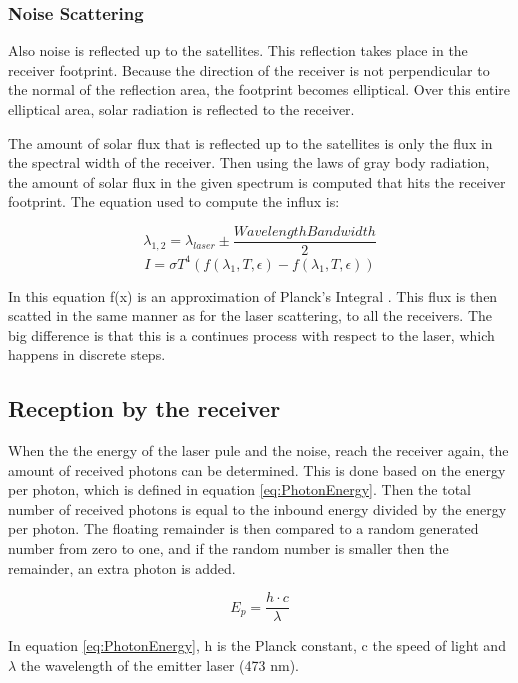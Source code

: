 \subsubsection{Noise Scattering}

Also noise is reflected up to the satellites. This reflection takes place in the receiver footprint. Because the direction of the receiver is not perpendicular to the normal of the reflection area, the footprint becomes elliptical. Over this entire elliptical area, solar radiation is reflected to the receiver.

The amount of solar flux that is reflected up to the satellites is only the flux in the spectral width of the receiver. Then using the laws of gray body radiation, the amount of solar flux in the given spectrum is computed that hits the receiver footprint. The equation used to compute the influx is:

\begin{equation}
	\lambda_{1,2} = \lambda _{laser} \pm \frac{Wavelength Bandwidth}{2}
\end{equation}
\begin{equation}
	I = \sigma T^4 (f(\lambda _1, T, \epsilon) - f(\lambda _1, T, \epsilon))
\end{equation}

In this equation f(x) is an approximation of Planck's Integral \cite[p.~26]{rees}. This flux is then scatted in the same manner as for the laser scattering, to all the receivers. The big difference is that this is a continues process with respect to the laser, which happens in discrete steps.

\subsection{Reception by the receiver}

When the the energy of the laser pule and the noise, reach the receiver again, the amount of received photons can be determined. This is done based on the energy per photon, which is defined in equation \ref{eq:PhotonEnergy}. Then the total number of received photons is equal to the inbound energy divided by the energy per photon. The floating remainder is then compared to a random generated number from zero to one, and if the random number is smaller then the remainder, an extra photon is added.

\begin{equation}
	E_{p}=\frac{h \cdot c}{\lambda}
	\label{eq:PhotonEnergy}
\end{equation}

In equation \ref{eq:PhotonEnergy}, h is the Planck constant, c the speed of light and $\lambda$ the wavelength of the emitter laser (473 nm).
